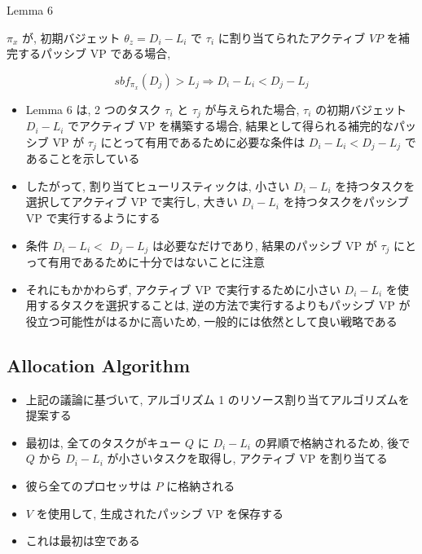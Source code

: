 \begin{frame}[label=lemma6]{Lemma 6}
    \begin{lemma}[]
        $\pi_{x}$ が, 初期バジェット $\theta_{z}=D_{i}-L_{i}$ で $\tau_{i}$ に割り当てられたアクティブ $V P$ を補完するパッシブ VP である場合,

        \begin{equation*}
            s b f_{\pi_{x}}\left(D_{j}\right)>L_{j} \Rightarrow D_{i}-L_{i}<D_{j}-L_{j}
        \end{equation*}
    \end{lemma}
\end{frame}

\begin{frame}{}
    \begin{itemize}
        \item Lemma 6 は, 2 つのタスク $\tau_{i}$ と $\tau_{j}$ が与えられた場合, $\tau_{i}$ の初期バジェット $D_{i}-L_{i}$ でアクティブ VP を構築する場合, 結果として得られる補完的なパッシブ VP が $\tau_{j}$ にとって有用であるために必要な条件は $D_{i}-L_{i}<D_{j}-L_{j}$ であることを示している
\item したがって, 割り当てヒューリスティックは, 小さい $D_{i}-L_{i}$ を持つタスクを選択してアクティブ VP で実行し, 大きい $D_{i}-L_{i}$ を持つタスクをパッシブ VP で実行するようにする
\item 条件 $D_{i}-L_{i}<$  $D_{j}-L_{j}$ は必要なだけであり, 結果のパッシブ VP が $\tau_{j}$ にとって有用であるために十分ではないことに注意
\item それにもかかわらず, アクティブ VP で実行するために小さい $D_{i}-L_{i}$ を使用するタスクを選択することは, 逆の方法で実行するよりもパッシブ VP が役立つ可能性がはるかに高いため, 一般的には依然として良い戦略である
    \end{itemize}
\end{frame}


\subsection{Allocation Algorithm}
\label{ssec: allocation algorithm}

\begin{frame}{}
    \begin{itemize}
        \item 上記の議論に基づいて, アルゴリズム 1 のリソース割り当てアルゴリズムを提案する
\item 最初は, 全てのタスクがキュー $Q$ に $D_{i}-L_{i}$ の昇順で格納されるため, 後で $Q$ から $D_{i}-L_{i}$ が小さいタスクを取得し, アクティブ VP を割り当てる
\item 彼ら全てのプロセッサは $P$ に格納される
\item $V$ を使用して, 生成されたパッシブ VP を保存する
\item これは最初は空である
    \end{itemize}
\end{frame}

